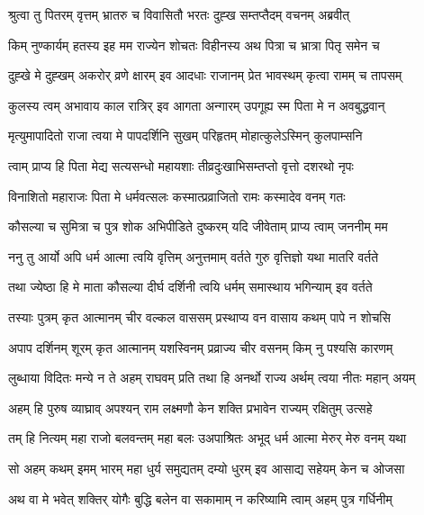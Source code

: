 
\twolineshloka
{श्रुत्वा तु पितरम् वृत्तम् भ्रातरु च विवासितौ}
{भरतः दुह्ख सम्तप्तैदम् वचनम् अब्रवीत्} %

\twolineshloka
{किम् नुण्कार्यम् हतस्य इह मम राज्येन शोचतः}
{विहीनस्य अथ पित्रा च भ्रात्रा पितृ समेन च} %

\twolineshloka
{दुह्खे मे दुह्खम् अकरोर् व्रणे क्षारम् इव आदधाः}
{राजानम् प्रेत भावस्थम् कृत्वा रामम् च तापसम्} %

\twolineshloka
{कुलस्य त्वम् अभावाय काल रात्रिर् इव आगता}
{अन्गारम् उपगूह्य स्म पिता मे न अवबुद्धवान्} %

\twolineshloka
{मृत्युमापादितो राजा त्वया मे पापदर्शिनि}
{सुखम् परिहृतम् मोहात्कुलेऽस्मिन् कुलपाम्सनि} %

\twolineshloka
{त्वाम् प्राप्य हि पिता मेद्य सत्यसन्धो महायशाः}
{तीव्रदुःखाभिसम्तप्तो वृत्तो दशरथो नृपः} %

\twolineshloka
{विनाशितो महाराजः पिता मे धर्मवत्सलः}
{कस्मात्प्रव्राजितो रामः कस्मादेव वनम् गतः} %

\twolineshloka
{कौसल्या च सुमित्रा च पुत्र शोक अभिपीडिते}
{दुष्करम् यदि जीवेताम् प्राप्य त्वाम् जननीम् मम} %

\twolineshloka
{ननु तु आर्यो अपि धर्म आत्मा त्वयि वृत्तिम् अनुत्तमाम्}
{वर्तते गुरु वृत्तिज्ञो यथा मातरि वर्तते} %

\twolineshloka
{तथा ज्येष्ठा हि मे माता कौसल्या दीर्घ दर्शिनी}
{त्वयि धर्मम् समास्थाय भगिन्याम् इव वर्तते} %

\twolineshloka
{तस्याः पुत्रम् कृत आत्मानम् चीर वल्कल वाससम्}
{प्रस्थाप्य वन वासाय कथम् पापे न शोचसि} %

\twolineshloka
{अपाप दर्शिनम् शूरम् कृत आत्मानम् यशस्विनम्}
{प्रव्राज्य चीर वसनम् किम् नु पश्यसि कारणम्} %

\twolineshloka
{लुब्धाया विदितः मन्ये न ते अहम् राघवम् प्रति}
{तथा हि अनर्थो राज्य अर्थम् त्वया नीतः महान् अयम्} %

\twolineshloka
{अहम् हि पुरुष व्याघ्राव् अपश्यन् राम लक्ष्मणौ}
{केन शक्ति प्रभावेन राज्यम् रक्षितुम् उत्सहे} %

\twolineshloka
{तम् हि नित्यम् महा राजो बलवन्तम् महा बलः}
{उअपाश्रितः अभूद् धर्म आत्मा मेरुर् मेरु वनम् यथा} %

\twolineshloka
{सो अहम् कथम् इमम् भारम् महा धुर्य समुद्यतम्}
{दम्यो धुरम् इव आसाद्य सहेयम् केन च ओजसा} %

\twolineshloka
{अथ वा मे भवेत् शक्तिर् योगैः बुद्धि बलेन वा}
{सकामाम् न करिष्यामि त्वाम् अहम् पुत्र गर्धिनीम्} %

